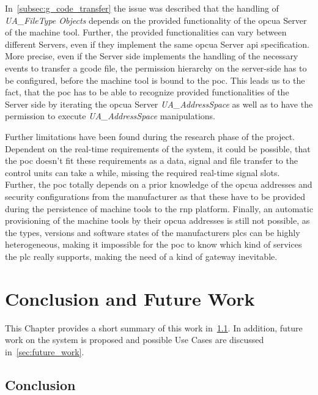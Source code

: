 \documentclass[
a4paper,
twoside,
headsepline,
cleardoublepage=empty,
parskip=half,
draft=false
]{scrbook}
\begin{document}
			In~\cref{subsec:g_code_transfer} the issue was described that the handling of \textit{UA\_FileType Objects} depends on the provided functionality of the \gls{opcua} Server of the machine tool. 
			Further, the provided functionalities can vary between different Servers, even if they implement the same \gls{opcua} Server \gls{api} specification. More precise, even if the Server side implements the handling of the necessary events to transfer a \gls{gcode} file, the permission hierarchy on the server-side has to be configured, before the machine tool is bound to the \gls{poc}. This leads us to the fact, that the \gls{poc} has to be able to recognize provided functionalities of the Server side by iterating the \gls{opcua} Server \textit{UA\_AddressSpace} as well as to have the permission to execute \textit{UA\_AddressSpace} manipulations.

			Further limitations have been found during the research phase of the project. Dependent on the real-time requirements of the system, it could be possible, that the \gls{poc} doesn't fit these requirements as a data, signal and file transfer to the control units can take a while, missing the required real-time signal slots. 
			Further, the \gls{poc} totally depends on a prior knowledge of the \gls{opcua} addresses and security configurations from the manufacturer as that these have to be provided during the persistence of machine tools to the \gls{rnp} platform. 
			Finally, an automatic provisioning of the machine tools by their \gls{opcua} addresses is still not possible, as the types, versions and software states of the manufacturers \gls{plc}s can be highly heterogeneous, making it impossible for the \gls{poc} to know which kind of services the \gls{plc} really supports, making the need of a kind of gateway inevitable.

	\chapter{Conclusion and Future Work} \label{ch:conclusion_and_future_work}

		This Chapter provides a short summary of this work in~\cref{sec:conclusion}. In addition, future work on the system is proposed and possible Use Cases are discussed in~\cref{sec:future_work}.

		\section{Conclusion}\label{sec:conclusion}
\end{document}
